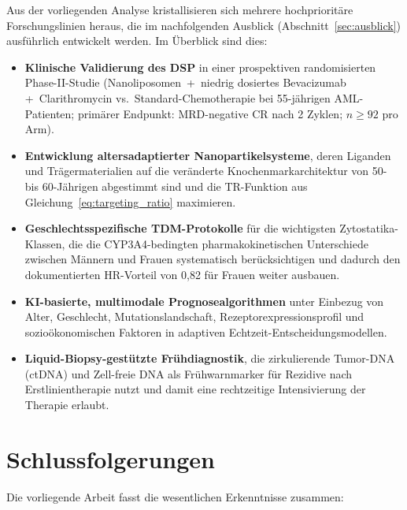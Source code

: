 ﻿\documentclass[12pt,a4paper]{article}
\theoremstyle{definition}
\begin{document}
Aus der vorliegenden Analyse kristallisieren sich mehrere hochprioritäre
Forschungslinien heraus, die im nachfolgenden Ausblick (Abschnitt~\ref{sec:ausblick})
ausführlich entwickelt werden. Im Überblick sind dies:
\begin{itemize}
  \item \textbf{Klinische Validierung des DSP} in einer prospektiven randomisierten
        Phase-II-Studie (Nanoliposomen~+~niedrig dosiertes Bevacizumab
        +~Clarithromycin vs.~Stan\-dard-Chemotherapie bei 55-jährigen AML-Patienten;
        primärer Endpunkt: MRD-negative CR nach 2 Zyklen; $n\geq 92$ pro Arm).
  \item \textbf{Entwicklung altersadaptierter Nanopartikelsysteme}, deren Liganden
        und Trägermaterialien auf die veränderte Knochenmarkarchitektur von
        50- bis 60-Jährigen abgestimmt sind und die TR-Funktion aus
        Gleichung~\eqref{eq:targeting_ratio} maximieren.
  \item \textbf{Geschlechtsspezifische TDM-Protokolle} für die wichtigsten
        Zytostatika-Klassen, die die CYP3A4-bedingten pharmakokinetischen
        Unterschiede zwischen Männern und Frauen systematisch berücksichtigen und
        dadurch den dokumentierten HR-Vorteil von 0,82 für Frauen weiter ausbauen.
  \item \textbf{KI-basierte, multimodale Prognosealgorithmen} unter Einbezug von
        Alter, Geschlecht, Mutationslandschaft, Rezeptorexpressionsprofil und
        sozioökonomischen Faktoren in adaptiven Echtzeit-Entscheidungsmodellen.
  \item \textbf{Liquid-Biopsy-gestützte Frühdiagnostik}, die zirkulierende
        Tumor-DNA (ctDNA) und Zell-freie DNA als Frühwarnmarker für Rezidive
        nach Erstlinientherapie nutzt und damit eine rechtzeitige Intensivierung
        der Therapie erlaubt.
\end{itemize}

\section{Schlussfolgerungen}
\label{sec:schluss}

Die vorliegende Arbeit fasst die wesentlichen Erkenntnisse zusammen:
\end{document}
